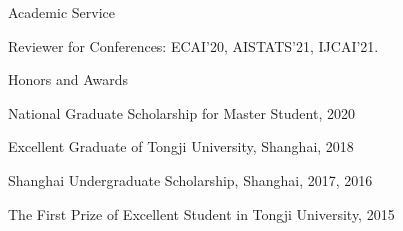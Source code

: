 \documentclass{resume} %
\begin{document}




\begin{rSection}{Academic Service }
\begin{enumerate}[{label = [\arabic*]}]
\item Reviewer for Conferences: ECAI'20, AISTATS'21, IJCAI'21.
\end{enumerate}

\end{rSection}




\begin{rSection}{Honors and Awards}
\begin{enumerate}[{label = [\arabic*]}]
\item National Graduate Scholarship for Master Student, 2020
\item Excellent Graduate of Tongji University, Shanghai, 2018
\item Shanghai Undergraduate Scholarship, Shanghai, 2017, 2016
\item The First Prize of Excellent Student in Tongji University, 2015
\end{enumerate}
\end{rSection}
\end{document}
